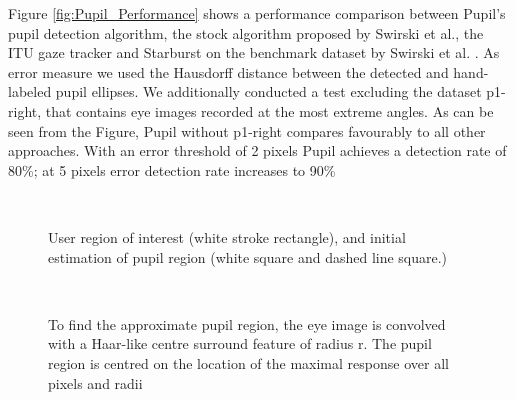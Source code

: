 \documentclass[12pt,fleqn]{book} %
\begin{document}
Figure \ref{fig:Pupil_Performance} shows a performance comparison between Pupil’s pupil detection algorithm, the stock algorithm proposed by Swirski et al., the ITU gaze tracker and Starburst on the benchmark dataset by Swirski et al. \cite{DataSet}. As error measure we used the Hausdorff distance between the detected and hand-labeled pupil ellipses. We additionally conducted a test excluding the dataset p1-right, that contains eye images recorded at the most extreme angles.
As can be seen from the Figure, Pupil without p1-right compares favourably to all other approaches. With an error threshold of 2 pixels Pupil achieves a detection rate of 80\%; at 5 pixels error detection rate increases to 90\%

\begin{figure}[]
\begin{dBox}
\centering
  \mbox{
   }
   \caption{ User region of interest (white stroke rectangle), and initial estimation of pupil region (white square and dashed line square.)
 \label{fig:Pupil Region} }   
\end{dBox}   
\end{figure}


\begin{figure}[]
\begin{dBox}
\centering
  \mbox{
   }
   \caption{ To find the approximate pupil region, the eye image is convolved with a Haar-like centre surround feature of radius r. The pupil region is centred on the location of the maximal response over all pixels and radii
 \label{fig:EstimationPupilFig} }   
\end{dBox}   
\end{figure}
\end{document}
